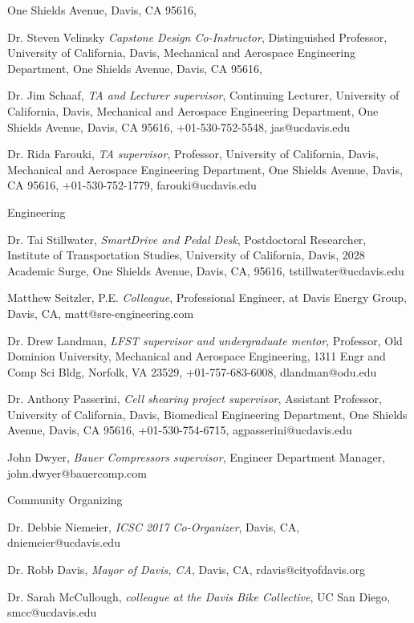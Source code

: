 \documentclass[10pt]{article}
\newenvironment{outerlist}[1][\enskip\textbullet]%
        {\begin{itemize}[#1]}{\end{itemize}%
         \vspace{-.6\baselineskip}}
\newenvironment{innerlist}[1][\enskip\textbullet]%
        {\begin{compactitem}[#1]}{\end{compactitem}}
\begin{document}
\begin{outerlist}
\begin{innerlist}
        One Shields Avenue, Davis, CA 95616,
      \item Dr. Steven Velinsky
        \emph{Capstone Design Co-Instructor},
        Distinguished Professor,
        University of California, Davis,
        Mechanical and Aerospace Engineering Department,
        One Shields Avenue, Davis, CA 95616,
      \item Dr. Jim Schaaf,
        \emph{TA and Lecturer supervisor},
        Continuing Lecturer,
        University of California, Davis,
        Mechanical and Aerospace Engineering Department,
        One Shields Avenue, Davis, CA 95616,
        +01-530-752-5548,
        jas@ucdavis.edu
      \item Dr. Rida Farouki,
        \emph{TA supervisor},
        Professor,
        University of California, Davis,
        Mechanical and Aerospace Engineering Department,
        One Shields Avenue, Davis, CA 95616,
        +01-530-752-1779,
        farouki@ucdavis.edu
    \end{innerlist}
  \item[] Engineering
    \begin{innerlist}
      \item Dr. Tai Stillwater,
        \emph{SmartDrive and Pedal Desk},
        Postdoctoral Researcher,
        Institute of Transportation Studies,
        University of California, Davis,
        2028 Academic Surge, One Shields Avenue, Davis, CA, 95616,
        tstillwater@ucdavis.edu
      \item Matthew Seitzler, P.E. \emph{Colleague},
        Professional Engineer, at Davis Energy Group, Davis, CA,
        matt@sre-engineering.com
      \item Dr. Drew Landman,
        \emph{LFST supervisor and undergraduate mentor},
        Professor,
        Old Dominion University,
        Mechanical and Aerospace Engineering,
        1311 Engr and Comp Sci Bldg, Norfolk, VA 23529,
        +01-757-683-6008,
        dlandman@odu.edu
      \item Dr. Anthony Passerini,
        \emph{Cell shearing project supervisor},
        Assistant Professor,
        University of California, Davis,
        Biomedical Engineering Department,
        One Shields Avenue, Davis, CA 95616,
        +01-530-754-6715,
        agpasserini@ucdavis.edu
      \item John Dwyer,
        \emph{Bauer Compressors supervisor},
        Engineer Department Manager,
        john.dwyer@bauercomp.com
    \end{innerlist}
  \item[] Community Organizing
    \begin{innerlist}
      \item Dr. Debbie Niemeier,
        \emph{ICSC 2017 Co-Organizer},
        Davis, CA,
        dniemeier@ucdavis.edu
      \item Dr. Robb Davis,
        \emph{Mayor of Davis, CA},
        Davis, CA,
        rdavis@cityofdavis.org
      \item Dr. Sarah McCullough,
        \emph{colleague at the Davis Bike Collective},
        UC San Diego,
        smcc@ucdavis.edu
    \end{innerlist}
\end{outerlist}
%
\end{document}
